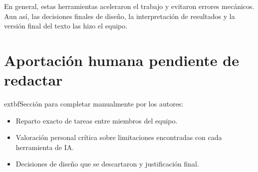 \documentclass[11pt,spanish,listoffigures,listoftables]{tfgetsinf}
\begin{document}
En general, estas herramientas aceleraron el trabajo y evitaron errores mecánicos. Aun así, las decisiones finales de diseño, la interpretación de resultados y la versión final del texto las hizo el equipo.

\section{Aportación humana pendiente de redactar}
	extbf{Sección para completar manualmente por los autores:}
\begin{itemize}
  \item Reparto exacto de tareas entre miembros del equipo.
  \item Valoración personal crítica sobre limitaciones encontradas con cada herramienta de IA.
  \item Decisiones de diseño que se descartaron y justificación final.
\end{itemize}

\cleardoublepage
\printbibliography


\APPENDIX




\end{document}
